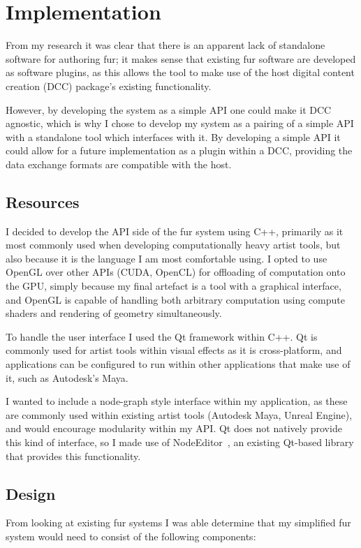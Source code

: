 \documentclass[]{acmsiggraph}
\begin{document}
\section{Implementation} \label{sec:implementation}
From my research it was clear that there is an apparent lack of standalone software for authoring fur; it makes sense that existing fur software are developed as software plugins, as this allows the tool to make use of the host digital content creation (DCC) package's existing functionality.

However, by developing the system as a simple API one could make it DCC agnostic, which is why I chose to develop my system as a pairing of a simple API with a standalone tool which interfaces with it. By developing a simple API it could allow for a future implementation as a plugin within a DCC, providing the data exchange formats are compatible with the host.

\subsection{Resources} \label{sec:resources}
I decided to develop the API side of the fur system using C++, primarily as it most commonly used when developing computationally heavy artist tools, but also because it is the language I am most comfortable using. I opted to use OpenGL over other APIs (CUDA, OpenCL) for offloading of computation onto the GPU, simply because my final artefact is a tool with a graphical interface, and OpenGL is capable of handling both arbitrary computation using compute shaders and rendering of geometry simultaneously.

To handle the user interface I used the Qt framework within C++. Qt is commonly used for artist tools within visual effects as it is cross-platform, and applications can be configured to run within other applications that make use of it, such as Autodesk's Maya.

I wanted to include a node-graph style interface within my application, as these are commonly used within existing artist tools (Autodesk Maya, Unreal Engine), and would encourage modularity within my API. Qt does not natively provide this kind of interface, so I made use of NodeEditor~\cite{Pinaev2017}, an existing Qt-based library that provides this functionality.

\subsection{Design} \label{sec:design}
From looking at existing fur systems I was able determine that my simplified fur system would need to consist of the following components:
\end{document}
